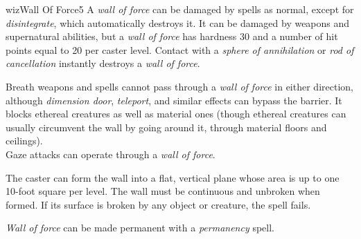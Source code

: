 \begin{spellcard}{wiz}{Wall Of Force}{5}
  A \emph{wall of force} can be damaged by spells as normal, except for
  \emph{disintegrate}, which automatically destroys it. It can be damaged
  by weapons and supernatural abilities, but a \emph{wall of force} has
  hardness 30 and a number of hit points equal to 20 per caster level.
  Contact with a \emph{sphere of annihilation} or \emph{rod of
    cancellation} instantly destroys a \emph{wall of force}.

  Breath weapons and spells cannot pass through a \emph{wall of force} in
  either direction, although \emph{dimension door}, \emph{teleport}, and
  si\-mi\-lar effects can bypass the barrier. It blocks ethereal creatures as
  well as material ones (though ethereal creatures can usually circumvent
  the wall by going around it, through material floors and ceilings).\\
  Gaze attacks can operate through a \emph{wall of force}.

  The caster can form the wall into a flat, vertical plane whose area is
  up to one 10-foot square per level. The wall must be continuous and
  unbroken when formed. If its surface is broken by any object or
  creature, the spell fails.

  \emph{Wall of force} can be made permanent with a \emph{permanency}
  spell.

\end{spellcard}

